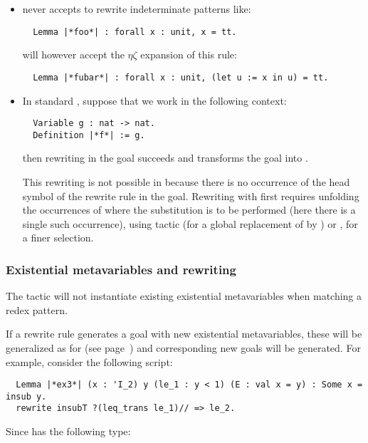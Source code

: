 \begin{itemize}
\item \ssr{} never accepts to rewrite indeterminate patterns like:
\begin{lstlisting}
  Lemma |*foo*| : forall x : unit, x = tt.
\end{lstlisting}
\ssr{} will however accept the $\eta\zeta$ expansion of this rule:
\begin{lstlisting}
  Lemma |*fubar*| : forall x : unit, (let u := x in u) = tt.
\end{lstlisting}
\item In standard \Coq{}, suppose that we work in the following context:
\begin{lstlisting}
  Variable g : nat -> nat.
  Definition |*f*| := g.
\end{lstlisting}
then rewriting  in the goal
 succeeds
and transforms the goal into .

This rewriting is not possible in \ssr{} because there is no
occurrence of the head symbol  of the rewrite rule in the
goal. Rewriting with  first requires unfolding the occurrences of
 where the substitution is to be performed (here there is a single
such occurrence), using tactic  (for a global
replacement of  by ) or , for a
finer selection.
\end{itemize}

\subsubsection*{Existential metavariables and rewriting}
\label{ssec:rewcaveats}
The  tactic will not instantiate existing existential
metavariables when matching a redex pattern.

If a rewrite rule generates a goal
with new existential metavariables, these will be generalized as for 
(see page~\pageref{sssec:apply}) and corresponding new goals will be generated.
For example, consider the following script:

\begin{lstlisting}
  Lemma |*ex3*| (x : 'I_2) y (le_1 : y < 1) (E : val x = y) : Some x = insub y.
  rewrite insubT ?(leq_trans le_1)// => le_2.
\end{lstlisting}

Since  has the following type:

